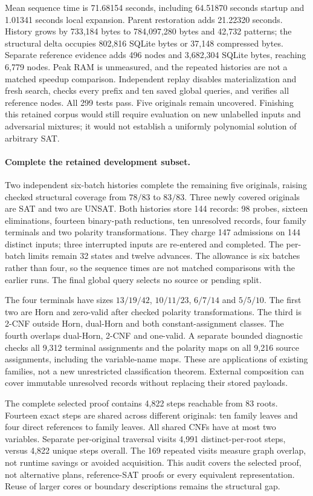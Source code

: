 \documentclass[11pt,a4paper]{article}
\numberwithin{equation}{section}
\theoremstyle{plain}
\theoremstyle{definition}
\theoremstyle{remark}
\begin{document}
Mean sequence time is 71.68154 seconds, including
64.51870 seconds startup and 1.01341 seconds local expansion.
Parent restoration adds 21.22320 seconds. History grows by 733,184 bytes
to 784,097,280 bytes and 42,732 patterns; the structural delta occupies 802,816
SQLite bytes or 37,148 compressed bytes. Separate reference evidence adds
496 nodes and 3,682,304 SQLite bytes, reaching 6,779 nodes. Peak RAM is unmeasured,
and the repeated histories are not a matched speedup comparison. Independent
replay disables materialization and fresh search, checks every prefix and ten
saved global queries, and verifies all reference nodes. All 299 tests pass.
Five originals remain uncovered. Finishing this retained corpus would still
require evaluation on new unlabelled inputs and adversarial mixtures; it would
not establish a uniformly polynomial solution of arbitrary SAT.

\paragraph{Complete the retained development subset.}
Two independent six-batch histories complete the remaining five originals,
raising checked structural coverage from $78/83$ to $83/83$. Three newly covered
originals are SAT and two are UNSAT. Both histories store 144 records: 98 probes,
sixteen eliminations, fourteen binary-path reductions, ten unresolved records,
four family terminals and two polarity transformations. They charge 147 admissions
on 144 distinct inputs; three interrupted inputs are re-entered and completed.
The per-batch limits remain 32 states and twelve advances. The allowance is six
batches rather than four, so the sequence times are not matched comparisons with
the earlier runs. The final global query selects no source or pending split.

The four terminals have sizes $13/19/42$, $10/11/23$, $6/7/14$ and $5/5/10$.
The first two are Horn and zero-valid after checked polarity transformations.
The third is 2-CNF outside Horn, dual-Horn and both constant-assignment classes.
The fourth overlaps dual-Horn, 2-CNF and one-valid. A separate bounded diagnostic
checks all 9,312 terminal assignments and the polarity maps on all 9,216 source
assignments, including the variable-name maps. These are applications of existing
families, not a new unrestricted classification theorem. External composition
can cover immutable unresolved records without replacing their stored payloads.

The complete selected proof contains 4,822 steps reachable from 83 roots.
Fourteen exact steps are shared across different originals: ten family leaves
and four direct references to family leaves. All shared CNFs have at most two
variables. Separate per-original traversal visits 4,991 distinct-per-root steps,
versus 4,822 unique steps overall. The 169 repeated visits measure graph overlap,
not runtime savings or avoided acquisition. This audit covers the selected proof,
not alternative plans, reference-SAT proofs or every equivalent representation.
Reuse of larger cores or boundary descriptions remains the structural gap.
\end{document}
